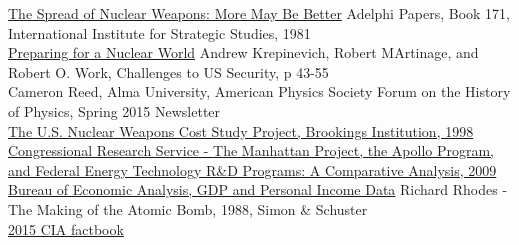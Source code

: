 \documentclass[journal]{IEEEtran}
\begin{document}

%
%
%
\begin{thebibliography}{1}
\href{http://polsci.colorado.edu/sites/default/files/10B_Waltz.pdf}{The Spread of Nuclear Weapons: More May Be Better} Adelphi Papers, Book 171, International Institute for Strategic Studies, 1981\\

\href{http://polsci.colorado.edu/sites/default/files/10B_Waltz.pdf}{Preparing for a Nuclear World} Andrew Krepinevich, Robert MArtinage, and Robert O. Work, Challenges to US Security, p 43-55\\

Cameron Reed, Alma University, American Physics Society Forum on the History of Physics, Spring 2015 Newsletter\\

\href{http://www.brookings.edu/about/projects/archive/nucweapons/manhattan}{The U.S. Nuclear Weapons Cost Study Project, Brookings Institution, 1998}\\

 \href{http://fas.org/sgp/crs/misc/RL34645.pdf}{Congressional Research Service - 
The Manhattan Project, the Apollo Program, 
and Federal Energy Technology R\&D 
Programs: A Comparative Analysis, 2009}\\

 \href{http://www.bea.gov/iTable/iTable.cfm?ReqID=9&step=1#reqid=9&step=1&isuri=1}{Bureau of Economic Analysis, GDP and Personal Income Data}
 Richard Rhodes - The Making of the Atomic Bomb, 1988, Simon \& Schuster\\

 \href{https://www.cia.gov/library/publications/the-world-factbook/fields/2195.html}{2015 CIA factbook}\\


\end{thebibliography}
\end{document}
